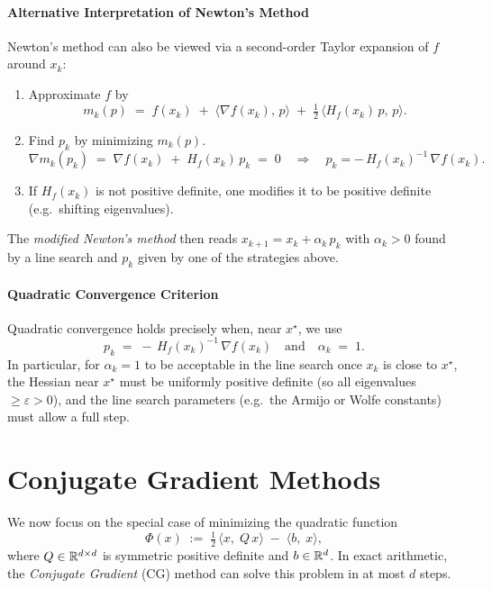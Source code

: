 \paragraph{Alternative Interpretation of Newton's Method}
Newton's method can also be viewed via a second-order Taylor expansion of \(f\) around \(x_k\):

\begin{enumerate}
  \item Approximate \(f\) by
        \[
          m_k(p) \;=\; f(x_k) \;+\; \langle \nabla f(x_k),\, p\rangle \;+\; \tfrac12\,\langle H_f(x_k)\,p,\,p\rangle.
        \]
  \item Find \(p_k\) by minimizing \(m_k(p)\).
        \[
          \nabla m_k(p_k) \;=\; \nabla f(x_k) \;+\; H_f(x_k)\,p_k \;=\; 0
          \quad\Longrightarrow\quad
          p_k = -\,H_f(x_k)^{-1}\,\nabla f(x_k).
        \]
  \item If \(H_f(x_k)\) is not positive definite, one modifies it to be positive definite (e.g.\ shifting eigenvalues).
\end{enumerate}

The \emph{modified Newton's method} then reads \(x_{k+1} = x_k + \alpha_k\,p_k\) with \(\alpha_k>0\) found by a line search and \(p_k\) given by one of the strategies above.

\paragraph{Quadratic Convergence Criterion}
Quadratic convergence holds precisely when, near \(x^\star\), we use
\[
  p_k \;=\; -\,H_f(x_k)^{-1}\,\nabla f(x_k)
  \quad\text{and}\quad
  \alpha_k \;=\; 1.
\]
In particular, for \(\alpha_k = 1\) to be acceptable in the line search once \(x_k\) is close to \(x^\star\), the Hessian near \(x^\star\) must be uniformly positive definite (so all eigenvalues \(\ge \varepsilon > 0\)), and the line search parameters (e.g.\ the Armijo or Wolfe constants) must allow a full step.

\section*{Conjugate Gradient Methods}

We now focus on the special case of minimizing the quadratic function
\[
  \Phi(x) \;:=\; \tfrac12\,\langle x,\;Q\,x\rangle \;-\; \langle b,\;x\rangle,
\]
where \(Q \in \mathbb{R}^{d\times d}\) is symmetric positive definite and \(b \in \mathbb{R}^d\). In exact arithmetic, the \emph{Conjugate Gradient} (CG) method can solve this problem in at most \(d\) steps.

